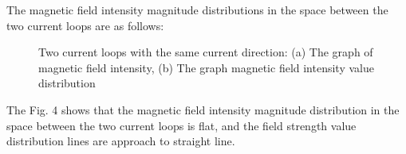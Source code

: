 \documentclass[journal,twocolumn,letterpaper]{IEEEJERM}
\begin{document}
The magnetic field intensity magnitude distributions in the space between the two current loops are as follows:
\begin{figure}[H]   
	\centering	  
	    \label{1a}\hfill	  
	\label{1b}
	\caption{Two current loops with the same current direction: (a) The graph of magnetic field intensity, (b) The graph magnetic field  intensity value distribution}	  
	\label{fig4} 
\end{figure}
The Fig. 4 shows that the magnetic field intensity magnitude distribution in the space between the two current loops is flat, and the field strength value distribution lines are approach to straight line.
\end{document}
